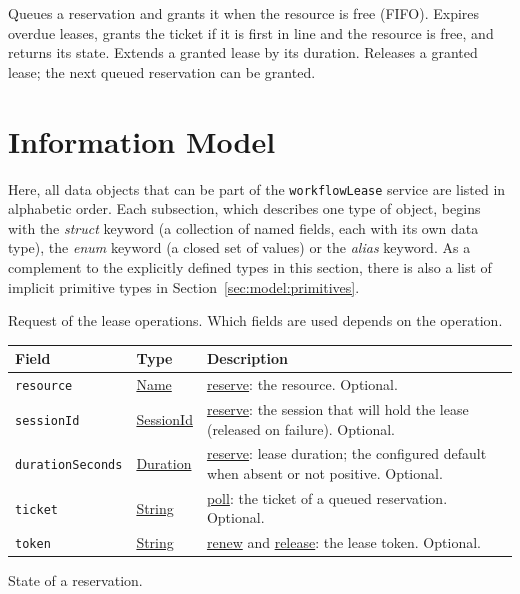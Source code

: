 \documentclass[a4paper]{arrowhead}
\newcommand{\oref}[1]{{\textcolor{ArrowheadBlue}{\hyperref[sec:operations:#1]{#1}}}}
\newcommand{\pref}[1]{{\textcolor{ArrowheadGrey}{\hyperref[sec:model:primitives:#1]{#1}}}}
\begin{document}
Queues a reservation and grants it when the resource is free (FIFO).
Expires overdue leases, grants the ticket if it is first in line and the resource is free, and returns its state.
Extends a granted lease by its duration.
Releases a granted lease; the next queued reservation can be granted.

\newpage
\section{Information Model}
\label{sec:model}
Here, all data objects that can be part of the \texttt{workflowLease} service are listed in alphabetic order. Each
subsection, which describes one type of object, begins with the \textit{struct} keyword (a collection of named fields,
each with its own data type), the \textit{enum} keyword (a closed set of values) or the \textit{alias} keyword. As a
complement to the explicitly defined types in this section, there is also a list of implicit primitive types in
Section~\ref{sec:model:primitives}.

Request of the lease operations. Which fields are used depends on the operation.

{\small
\begin{longtable}{|p{3.9cm}|p{4.4cm}|p{7.5cm}|}

\hline
\rowcolor{gray!33} Field & Type & Description \\ \hline
\endhead
\texttt{resource} & \pref{Name} & \oref{reserve}: the resource. Optional. \\ \hline
\texttt{sessionId} & \pref{SessionId} & \oref{reserve}: the session that will hold the lease (released on failure). Optional. \\ \hline
\texttt{durationSeconds} & \pref{Duration} & \oref{reserve}: lease duration; the configured default when absent or not positive. Optional. \\ \hline
\texttt{ticket} & \pref{String} & \oref{poll}: the ticket of a queued reservation. Optional. \\ \hline
\texttt{token} & \pref{String} & \oref{renew} and \oref{release}: the lease token. Optional. \\ \hline
\end{longtable}
}

State of a reservation.
\end{document}
